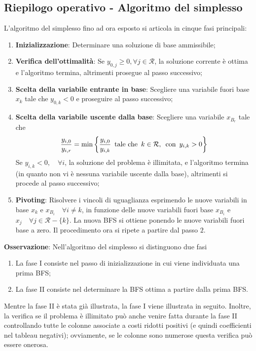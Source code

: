 \documentclass[a4paper]{extarticle}
\begin{document}
\subsection{Riepilogo operativo - Algoritmo del simplesso}
L'algoritmo del simplesso fino ad ora esposto si articola in cinque fasi principali:
\begin{enumerate}
    \item \textbf{Inizializzazione}: Determinare una soluzione di base ammissibile;
    \item \textbf{Verifica dell'ottimalità}: Se $y_{0,j} \geq 0, \forall j \in \mathcal{R}$, la soluzione corrente è ottima e l'algoritmo termina, altrimenti prosegue al passo successivo;
    \item \textbf{Scelta della variabile entrante in base}: Scegliere una variabile fuori base $x_k$ tale che $y_{0,k} < 0$ e proseguire al passo successivo;
    \item \textbf{Scelta della variabile uscente dalla base}: Scegliere una variabile $x_{B_r}$ tale che
    \[\frac{y_{i,0}}{y_{i,r}} = \min \left\{\frac{y_{i,0}}{y_{i,k}} \hspace{0.5em} \text{tale che} \hspace{0.5em} k \in \mathcal{R}, \hspace{0.5em} \text{con} \hspace{0.5em} y_{i,k} > 0\right\}\]
    Se $y_{i,k} < 0, \hspace{1em} \forall i$, la soluzione del problema è illimitata, e l'algoritmo termina (in quanto non vi è nessuna variabile uscente dalla base), altrimenti si procede al passo successivo;
    \item \textbf{Pivoting}: Risolvere i vincoli di uguaglianza esprimendo le nuove variabili in base $x_k$ e $x_{B_i} \hspace{1em} \forall i \neq k$, in funzione delle nuove variabili fuori base $x_{B_i}$ e $x_j \hspace{1em} \forall j \in \mathcal{R} - \{k\}$. La nuova BFS si ottiene ponendo le nuove variabili fuori base a zero. Il procedimento ora si ripete a partire dal passo $2$.
\end{enumerate}

\vspace{1em}
\noindent
\textbf{Osservazione}: Nell'algoritmo del simplesso si distinguono due fasi
\begin{enumerate}
    \item La fase I consiste nel passo di inizializzazione in cui viene individuata una prima BFS;
    \item La fase II consiste nel determinare la BFS ottima a partire dalla prima BFS.
\end{enumerate}
Mentre la fase II è stata già illustrata, la fase I viene illustrata in seguito. Inoltre, la verifica se il problema è illimitato può anche venire fatta durante la fase II controllando tutte le colonne associate a costi ridotti positivi (e quindi coefficienti nel tableau negativi); ovviamente, se le colonne sono numerose questa verifica può essere onerosa.
\end{document}
